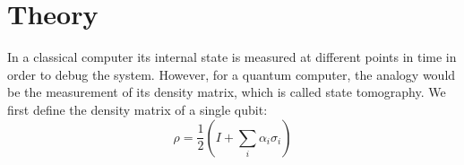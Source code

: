\section{Theory}
In a classical computer its internal state is measured at different points in time in order to debug the system. However, for a quantum computer, the analogy would be the measurement of its density matrix, which is called state tomography. We first define the density matrix of a single qubit:
\begin{equation}
\rho=\frac{1}{2}\left(I+\sum_i\alpha_i\sigma_i\right)
\end{equation}
